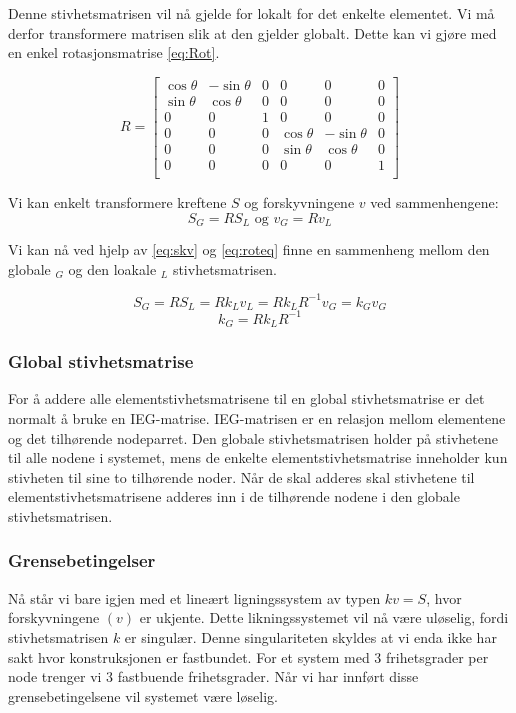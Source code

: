 \documentclass[10pt,a4paper, norsk]{article}
\begin{document}
Denne stivhetsmatrisen vil nå gjelde for lokalt for det enkelte elementet. Vi må derfor transformere matrisen slik at den gjelder globalt. Dette kan vi gjøre med en enkel rotasjonsmatrise \eqref{eq:Rot}. 

\begin{equation} \label{eq:Rot}
R  = \begin{bmatrix}
\cos \theta & -\sin \theta &   0&0&0&0\\[3pt]
\sin \theta & \cos \theta  & 0&0&0&0\\[3pt]
0 &0 & 1&0&0&0\\
0&0&0&\cos \theta & -\sin \theta&   0 \\[3pt]
0&0&0&\sin \theta & \cos \theta  & 0\\[3pt]
0&0&0&0 &0 & 1\\
\end{bmatrix} 
\end{equation}

Vi kan enkelt transformere kreftene $S$ og forskyvningene $v$ ved sammenhengene:
\begin{equation} \label{eq:roteq}
S_G=RS_L  \text{ og } v_G=Rv_L 
\end{equation}

Vi kan nå ved hjelp av \ref{eq:skv} og \ref{eq:roteq} finne en sammenheng mellom den globale $_G$ og den loakale $_L$ stivhetsmatrisen.

\begin{equation}
S_G=RS_L=Rk_Lv_L=Rk_LR^{-1}v_G=k_Gv_G 
\end{equation}
\begin{equation} \label{eq:klkg}
k_G=Rk_LR^{-1}
\end{equation}

\subsubsection*{Global stivhetsmatrise}
For å addere alle elementstivhetsmatrisene til en global stivhetsmatrise er det normalt å bruke en IEG-matrise. IEG-matrisen er en relasjon mellom elementene og det tilhørende nodeparret. Den globale stivhetsmatrisen holder på stivhetene til alle nodene i systemet, mens de enkelte elementstivhetsmatrise inneholder kun stivheten til sine to tilhørende noder. Når de skal adderes skal stivhetene til elementstivhetsmatrisene adderes inn i de tilhørende nodene i den globale stivhetsmatrisen. 

\subsubsection*{Grensebetingelser}
Nå står vi bare igjen med et lineært ligningssystem av typen $kv=S$, hvor forskyvningene $(v)$ er ukjente. Dette likningssystemet vil nå være uløselig, fordi stivhetsmatrisen $k$ er singulær. Denne singulariteten skyldes at vi enda ikke har sakt hvor konstruksjonen er fastbundet. For et system med 3 frihetsgrader per node trenger vi 3 fastbuende frihetsgrader. Når vi har innført disse grensebetingelsene vil systemet være løselig.
\end{document}
